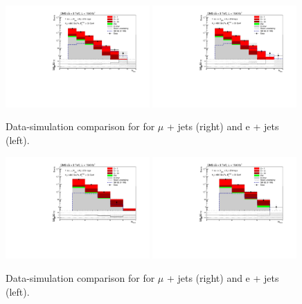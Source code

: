 \begin{figure}[ht!]
\centering
    \includegraphics[width=0.49\textwidth]{images/Run1/NbOfSelectedJets_mu.pdf}
     \includegraphics[width=0.49\textwidth]{images/Run1/NbOfSelectedJets_e.pdf}       
    \caption{Data-simulation comparison for \njets for $\mu$ + jets (right) and e + jets (left).}
    \label{fig:datasimnjets}
\end{figure}

\begin{figure}[ht!]
\centering
    \includegraphics[width=0.49\textwidth]{images/Run1/NbOfSelectedBJets_mu.pdf}
     \includegraphics[width=0.49\textwidth]{images/Run1/NbOfSelectedBJets_e.pdf}        
    \caption{Data-simulation comparison for \nbtags for $\mu$ + jets (right) and e + jets (left).}
    \label{fig:datasimnbtags}
\end{figure}

